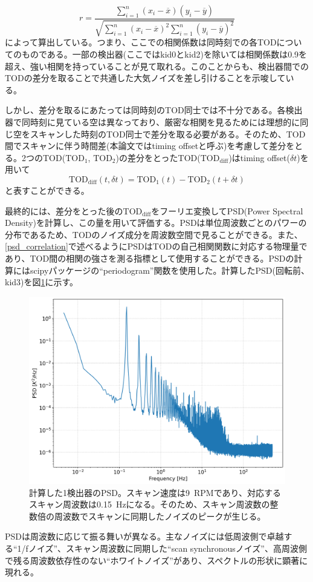 \begin{equation}
  r = \frac{\displaystyle\sum_{i=1}^{n}(x_{i}-\overline{x})(y_{i}-\overline{y})}{\sqrt{\displaystyle\sum_{i=1}^{n}(x_{i}-\overline{x})^{2}\displaystyle\sum_{i=1}^{n}(y_{i}-\overline{y})^{2}}}
\end{equation}
によって算出している。つまり、ここでの相関係数は同時刻での各TODについてのものである。一部の検出器(ここではkid0とkid2)を除いては相関係数は0.9を超え、強い相関を持っていることが見て取れる。このことからも、検出器間でのTODの差分を取ることで共通した大気ノイズを差し引けることを示唆している。

しかし、差分を取るにあたっては同時刻のTOD同士では不十分である。各検出器で同時刻に見ている空は異なっており、厳密な相関を見るためには理想的に同じ空をスキャンした時刻のTOD同士で差分を取る必要がある。そのため、TOD間でスキャンに伴う時間差(本論文ではtiming offsetと呼ぶ)を考慮して差分をとる。2つのTOD($\mathrm{TOD}_{1}$, $\mathrm{TOD}_{2}$)の差分をとったTOD($\mathrm{TOD}_{\mathrm{diff}}$)はtiming offset($\delta t$)を用いて
\begin{equation}
  \mathrm{TOD}_{\mathrm{diff}}(t,\delta t) = \mathrm{TOD}_{1}(t) - \mathrm{TOD}_{2}(t + \delta t) \label{eq:tod_diff}
\end{equation}
と表すことができる\cite{sueno_doctor}。

最終的には、差分をとった後の$\mathrm{TOD}_{\mathrm{diff}}$をフーリエ変換してPSD(Power Spectral Density)を計算し、この量を用いて評価する。PSDは単位周波数ごとのパワーの分布であるため、TODのノイズ成分を周波数空間で見ることができる。また、\ref{psd_correlation}で述べるようにPSDはTODの自己相関関数に対応する物理量であり、TOD間の相関の強さを測る指標として使用することができる。PSDの計算にはscipyパッケージの``periodogram\cite{periodogram}''関数を使用した。計算したPSD(回転前、kid3)を図\ref{9011_psd_kid3}に示す。
\begin{figure}[htbp]
  \centering
  \includegraphics[width=0.7\columnwidth]{5_alignment/figs/9011_kid3_psd.png}
  \caption{計算した1検出器のPSD。スキャン速度は\SI{9}{RPM}であり、対応するスキャン周波数は\SI{0.15}{Hz}になる。そのため、スキャン周波数の整数倍の周波数でスキャンに同期したノイズのピークが生じる。}
  \label{9011_psd_kid3}
\end{figure}
PSDは周波数に応じて振る舞いが異なる。主なノイズには低周波側で卓越する``1/fノイズ''、スキャン周波数に同期した``scan synchronousノイズ''、高周波側で残る周波数依存性のない``ホワイトノイズ''があり、スペクトルの形状に顕著に現れる。

